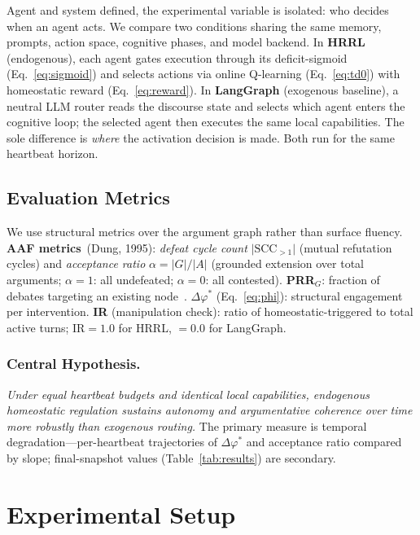 \documentclass{llncs}
\begin{document}
Agent and system defined, the experimental variable is isolated: who
decides when an agent acts.
We compare two conditions sharing the same memory, prompts, action space,
cognitive phases, and model backend.  In \textbf{HRRL} (endogenous), each
agent gates execution through its deficit-sigmoid
(Eq.~\ref{eq:sigmoid}) and selects actions via online Q-learning
(Eq.~\ref{eq:td0}) with homeostatic reward (Eq.~\ref{eq:reward}).
In \textbf{LangGraph} (exogenous baseline), a neutral LLM router reads the
discourse state and selects which agent enters the cognitive loop; the
selected agent then executes the same local capabilities.  The sole
difference is \emph{where} the activation decision is made.  Both run for
the same heartbeat horizon.

\subsection{Evaluation Metrics}

We use structural metrics over the argument graph rather than surface
fluency.  \textbf{AAF metrics}~(Dung, 1995): \emph{defeat cycle count}
$\lvert\text{SCC}_{>1}\rvert$ (mutual refutation cycles) and
\emph{acceptance ratio}
$\alpha = \lvert G \rvert / \lvert A \rvert$ (grounded extension over
total arguments; $\alpha{=}1$: all undefeated; $\alpha{=}0$: all
contested).  \textbf{PRR$_G$}: fraction of debates targeting an existing
node~\parencite{marandi2026prr}.  \textbf{$\Delta\varphi^*$}
(Eq.~\ref{eq:phi}): structural engagement per intervention.
\textbf{IR} (manipulation check): ratio of homeostatic-triggered to
total active turns; IR${=}1.0$ for HRRL, ${=}0.0$ for LangGraph.

\subsubsection{Central Hypothesis.}

\emph{Under equal heartbeat budgets and identical local capabilities,
endogenous homeostatic regulation sustains autonomy and argumentative
coherence over time more robustly than exogenous routing.}  The primary
measure is temporal degradation---per-heartbeat trajectories of
$\Delta\varphi^*$ and acceptance ratio compared by slope;
final-snapshot values (Table~\ref{tab:results}) are secondary.


\section{Experimental Setup}
\label{sec:setup}
\end{document}
